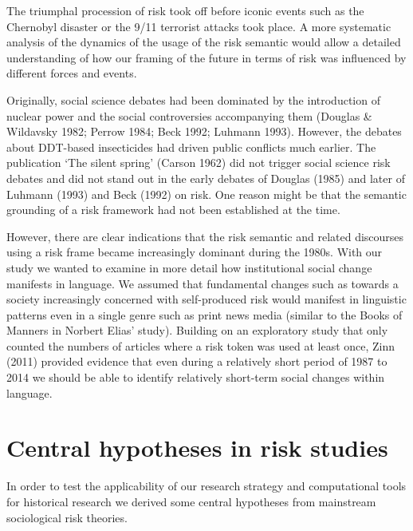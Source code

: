 The triumphal procession of risk took off before iconic events such as the Chernobyl disaster or the 9/11 terrorist attacks took place. A more systematic analysis of the dynamics of the usage of the risk semantic would allow a detailed understanding of how our framing of the future in terms of risk was influenced by different forces and events.

Originally, social science debates had been dominated by the introduction of nuclear power and the social controversies accompanying them (Douglas \& Wildavsky 1982; Perrow 1984; Beck 1992; Luhmann 1993). However, the debates about DDT-based insecticides had driven public conflicts much earlier. The publication `The silent spring' (Carson 1962) did not trigger social science risk debates and did not stand out in the early debates of Douglas (1985) and later of Luhmann (1993) and Beck (1992) on risk. One reason might be that the semantic grounding of a risk framework had not been established at the time.

However, there are clear indications that the risk semantic and related discourses using a risk frame became increasingly dominant during the 1980s. With our study we wanted to examine in more detail how institutional social change manifests in language. We assumed that fundamental changes such as towards a society increasingly concerned with self-produced risk would manifest in linguistic patterns even in a single genre such as print news media (similar to the Books of Manners in Norbert Elias' study). Building on an exploratory study that only counted the numbers of articles where a risk token was used at least once, Zinn (2011) provided evidence that even during a relatively short period of 1987 to 2014 we should be able to identify relatively short-term social changes within language.

\section{Central hypotheses in risk studies}

In order to test the applicability of our research strategy and computational tools for historical research we derived some central hypotheses from mainstream sociological risk theories. 

